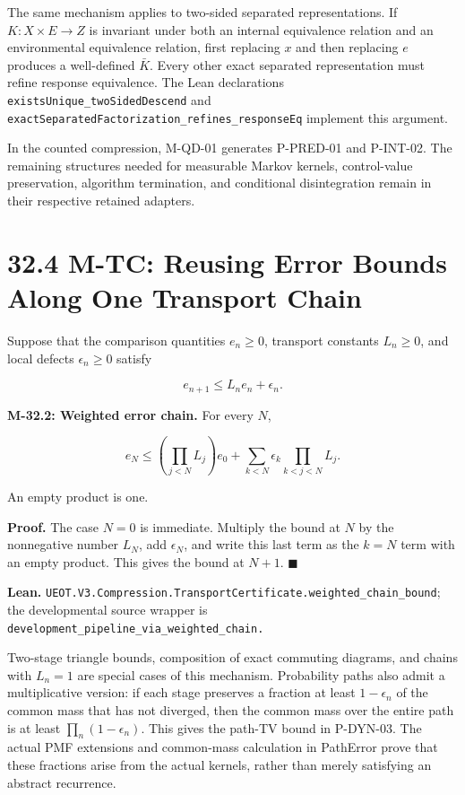 \documentclass[
  english,
  11pt,
  oneside]{book}
\begin{document}
The same mechanism applies to two-sided separated representations. If \(K:X\times E\to Z\) is invariant under both an internal equivalence relation and an environmental equivalence relation, first replacing \(x\) and then replacing \(e\) produces a well-defined \(\bar K\). Every other exact separated representation must refine response equivalence. The Lean declarations \nolinkurl{existsUnique_twoSidedDescend} and \nolinkurl{exactSeparatedFactorization_refines_responseEq} implement this argument.

In the counted compression, M-QD-01 generates P-PRED-01 and P-INT-02. The remaining structures needed for measurable Markov kernels, control-value preservation, algorithm termination, and conditional disintegration remain in their respective retained adapters.

\section{32.4 M-TC: Reusing Error Bounds Along One Transport Chain}\label{m-tc-reusing-error-bounds-along-one-transport-chain}

Suppose that the comparison quantities \(e_n\ge0\), transport constants \(L_n\ge0\), and local defects \(\epsilon_n\ge0\) satisfy

\[e_{n+1}\le L_ne_n+\epsilon_n.\]

\hypertarget{m-32-2}{}\label{m-32-2}

\textbf{M-32.2: Weighted error chain.} For every \(N\),

\[e_N\le \left(\prod_{j<N}L_j\right)e_0+
\sum_{k<N}\epsilon_k\prod_{k<j<N}L_j.\]

An empty product is one.

\textbf{Proof.} The case \(N=0\) is immediate. Multiply the bound at \(N\) by the nonnegative number \(L_N\), add \(\epsilon_N\), and write this last term as the \(k=N\) term with an empty product. This gives the bound at \(N+1\). \(\blacksquare\)

\textbf{Lean.} \nolinkurl{UEOT.V3.Compression.TransportCertificate.weighted_chain_bound}; the developmental source wrapper is \nolinkurl{development_pipeline_via_weighted_chain.}

Two-stage triangle bounds, composition of exact commuting diagrams, and chains with \(L_n=1\) are special cases of this mechanism. Probability paths also admit a multiplicative version: if each stage preserves a fraction at least \(1-\epsilon_n\) of the common mass that has not diverged, then the common mass over the entire path is at least \(\prod_n(1-\epsilon_n)\). This gives the path-TV bound in P-DYN-03. The actual PMF extensions and common-mass calculation in PathError prove that these fractions arise from the actual kernels, rather than merely satisfying an abstract recurrence.
\end{document}
